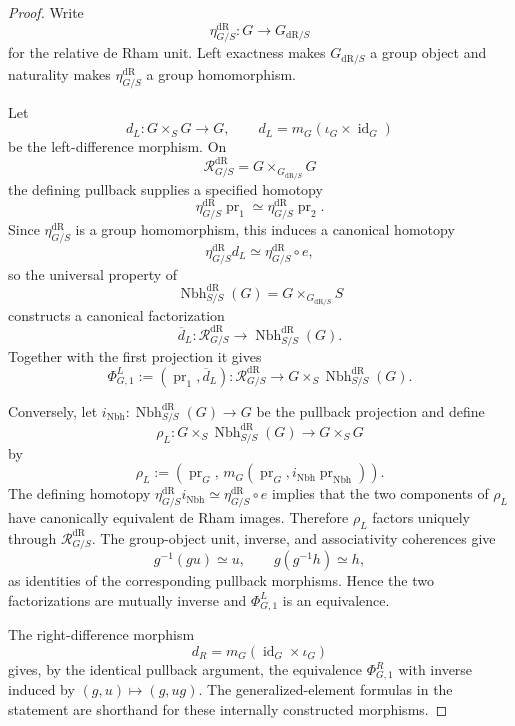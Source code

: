\begin{proof}
Write
\[
    \eta_{G/S}^{\mathrm{dR}}:G\longrightarrow G_{\mathrm{dR}/S}
\]
for the relative de Rham unit.  Left exactness makes
$G_{\mathrm{dR}/S}$ a group object and naturality makes $\eta_{G/S}^{\mathrm{dR}}$ a group
homomorphism.

Let
\[
    d_L:
    G\times_SG\longrightarrow G,
    \qquad
    d_L=m_G(\iota_G\times\operatorname{id}_G)
\]
be the left-difference morphism.  On
\[
    \mathcal R^{\mathrm{dR}}_{G/S}
    =
    G\times_{G_{\mathrm{dR}/S}}G
\]
the defining pullback supplies a specified homotopy
\[
    \eta_{G/S}^{\mathrm{dR}}\operatorname{pr}_1
    \simeq
    \eta_{G/S}^{\mathrm{dR}}\operatorname{pr}_2.
\]
Since $\eta_{G/S}^{\mathrm{dR}}$ is a group homomorphism, this induces a canonical homotopy
\[
    \eta_{G/S}^{\mathrm{dR}}d_L
    \simeq
    \eta_{G/S}^{\mathrm{dR}}\circ e,
\]
so the universal property of
\[
    \operatorname{Nbh}^{\mathrm{dR}}_{S/S}(G)
    =
    G\times_{G_{\mathrm{dR}/S}}S
\]
constructs a canonical factorization
\[
    \overline d_L:
    \mathcal R^{\mathrm{dR}}_{G/S}\longrightarrow\operatorname{Nbh}^{\mathrm{dR}}_{S/S}(G).
\]
Together with the first projection it gives
\[
    \Phi^L_{G,1}
    :=
    (\operatorname{pr}_1,\overline d_L):
    \mathcal R^{\mathrm{dR}}_{G/S}\longrightarrow G\times_S\operatorname{Nbh}^{\mathrm{dR}}_{S/S}(G).
\]

Conversely, let $i_{\mathrm{Nbh}}:\operatorname{Nbh}^{\mathrm{dR}}_{S/S}(G)\to G$ be the pullback projection and define
\[
    \rho_L:
    G\times_S\operatorname{Nbh}^{\mathrm{dR}}_{S/S}(G)
    \longrightarrow
    G\times_SG
\]
by
\[
    \rho_L
    :=
    \left(
        \operatorname{pr}_G,\,
        m_G(\operatorname{pr}_G,i_{\mathrm{Nbh}}\operatorname{pr}_{\mathrm{Nbh}})
    \right).
\]
The defining homotopy $\eta_{G/S}^{\mathrm{dR}}i_{\mathrm{Nbh}}\simeq \eta_{G/S}^{\mathrm{dR}}\circ e$ implies that the
two components of $\rho_L$ have canonically equivalent de Rham images.
Therefore $\rho_L$ factors uniquely through
$\mathcal R^{\mathrm{dR}}_{G/S}$.  The group-object unit, inverse, and associativity
coherences give
\[
    g^{-1}(gu)\simeq u,
    \qquad
    g(g^{-1}h)\simeq h,
\]
as identities of the corresponding pullback morphisms.  Hence the two
factorizations are mutually inverse and $\Phi^L_{G,1}$ is an equivalence.

The right-difference morphism
\[
    d_R=m_G(\operatorname{id}_G\times\iota_G)
\]
gives, by the identical pullback argument, the equivalence $\Phi^R_{G,1}$ with
inverse induced by $(g,u)\mapsto(g,ug)$.  The generalized-element formulas in
the statement are shorthand for these internally constructed morphisms.
\end{proof}

